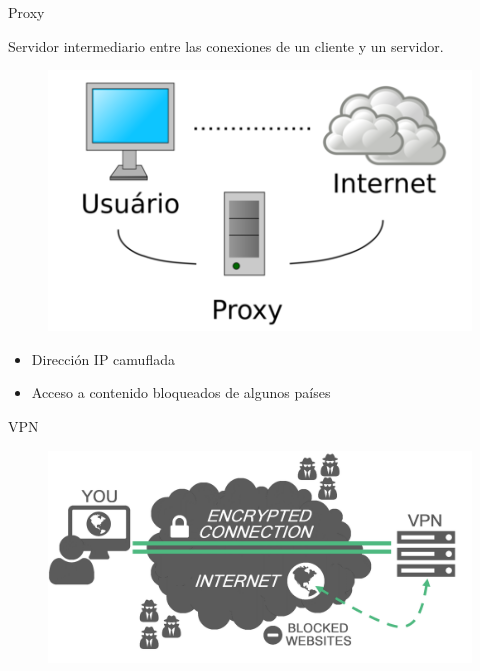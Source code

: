 \documentclass[spanish]{beamer}
\begin{document}
\begin{frame}{Proxy}
	
Servidor intermediario entre las conexiones de un cliente y un servidor. \\


\begin{figure}[h]
	\centering
	\includegraphics[width=.5\textwidth]{img/proxy}
\end{figure}

\begin{itemize}
	\item Dirección IP camuflada \\
	\item Acceso a contenido bloqueados de algunos países \\ 
\end{itemize}
	
\end{frame}




\begin{frame}{VPN}
	\begin{figure}[h]
		\centering
		\includegraphics[width=.8\textwidth]{img/vpn}
	\end{figure}
\end{frame}
\end{document}
